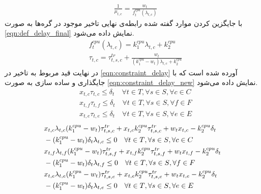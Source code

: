 \begin{align}
	&\frac{1}{\mu_{t,c}} = \frac{w_t}{f_t^{cpu}(\lambda_{t,c})} \label{eqn:def_mu}
\end{align}
 با جایگزین کردن موارد گفته شده رابطه‌ی نهایی تاخیر موجود در گره‌ها به صورت \cref{eqn:def_delay_final} نمایش داده می‌شود. 
	\begin{subequations}
		\begin{align}
			&f_t^{cpu}(\lambda_{t,c}) = k_1^{cpu}\lambda_{t,c}+k_2^{cpu} \\
			&\tau_{t,c} = \tau_{t,s,c}^{tr} + \frac{w_t}{(k_1^{cpu}-w_t)\lambda_{t,c} + k_2^{cpu}} \label{eqn:def_delay_final}
		\end{align}
	\end{subequations}
	در نهایت قید مربوط به تاخیر در \cref{eqn:constraint_delay} آورده شده است که با جایگذاری و ساده سازی به صورت \cref{eqn:constraint_delay_new} نمایش داده می‌شود. 
	\begin{subequations}
		\begin{align}\label{eqn:constraint_delay}
			&x_{t,c}\tau_{t,c}\le \delta_t \quad \forall{t \in T}, \forall{s \in S}, \forall{c \in C} \\
			&x_{t,f}\tau_{t,f}\le \delta_t \quad \forall{t \in T}, \forall{s \in S}, \forall{f \in F} \\
			&x_{t,e}\tau_{t,e}\le \delta_t \quad \forall{t \in T}, \forall{s \in S}, \forall{e \in E} 
		\end{align}
	\end{subequations}
	\begin{subequations}\label{eqn:constraint_delay_new}
		\begin{align}		
			&x_{t,c}\lambda_{t,c}(k_1^{cpu}-w_t)\tau^{tr}_{t,s,c} + x_{t,c}k_2^{cpu}\tau_{t,s,c}^{tr}+w_t x_{t,c}-k_2^{cpu}\delta_t \notag \\ &-(k_1^{cpu}-w_t)\delta_t\lambda_{t,c} \le 0 \quad \forall{t \in T}, \forall{s \in S}, \forall{c \in C} \\
			&x_{t,f}\lambda_{t,f}(k_1^{cpu}-w_t)\tau^{tr}_{t,s,f} + x_{t,f}k_2^{cpu}\tau_{t,s,f}^{tr}+w_t x_{t,f}-k_2^{cpu}\delta_t \notag \\ &-(k_1^{cpu}-w_t)\delta_t\lambda_{t,f} \le 0 \quad \forall{t \in T}, \forall{s \in S}, \forall{f \in F}  \\			
			&x_{t,e}\lambda_{t,e}(k_1^{cpu}-w_t)\tau^{tr}_{t,s,e} + x_{t,e}k_2^{cpu}\tau_{t,s,e}^{tr}+w_t x_{t,e}-k_2^{cpu}\delta_t \notag \\ &-(k_1^{cpu}-w_t)\delta_t\lambda_{t,e} \le 0 \quad \forall{t \in T}, \forall{s \in S}, \forall{e \in E}  
		\end{align}
	\end{subequations}
